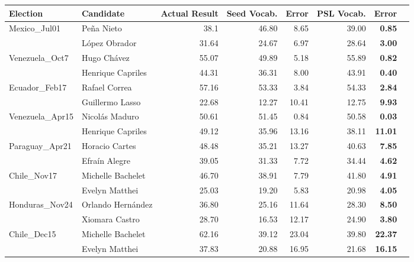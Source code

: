 \begin{table*}[ht]
		\centering
		\begin{tabular}{| l | l | r | r | r | r | r | r |}
		\hline
		Election & Candidate & Actual Result & Seed Vocab. & Error & PSL Vocab. & Error \\
		\hline
		\multirow{2}{*}{Mexico\_Jul01} & Pe\~{n}a Nieto & 38.1 & 46.80 & 8.65 & 39.00 & \textbf{0.85} \\\cline{2-7}
											   & L\'{o}pez Obrador & 31.64 & 24.67 & 6.97 & 28.64 & \textbf{3.00} \\
		\hline
		\multirow{2}{*}{Venezuela\_Oct7} & Hugo Ch\'{a}vez & 55.07 & 49.89 & 5.18 & 55.89 & \textbf{0.82}\\\cline{2-7}
																& Henrique Capriles & 44.31 & 36.31 & 8.00 & 43.91 & \textbf{0.40} \\
		\hline
		\multirow{2}{*}{Ecuador\_Feb17} & Rafael Correa & 57.16 & 53.33 & 3.84 & 54.33 & \textbf{2.84} \\\cline{2-7}
												 & Guillermo Lasso & 22.68 & 12.27 & 10.41 & 12.75 & \textbf{9.93} \\
		\hline
		 \multirow{2}{*}{Venezuela\_Apr15} & Nicol\'{a}s Maduro & 50.61 & 51.45 & 0.84 & 50.58 & \textbf{0.03} \\\cline{2-7}
																	& Henrique Capriles & 49.12 & 35.96 & 13.16 & 38.11 & \textbf{11.01} \\
		\hline
		\multirow{2}{*}{Paraguay\_Apr21} & Horacio Cartes & 48.48 & 35.21 & 13.27 & 40.63 & \textbf{7.85} \\\cline{2-7}
												   & Efra\'{i}n Alegre & 39.05 & 31.33 & 7.72 & 34.44 & \textbf{4.62} \\
		\hline
		\multirow{2}{*}{Chile\_Nov17} & Michelle Bachelet & 46.70 & 38.91 & 7.79 & 41.80 & \textbf{4.91}\\\cline{2-7}
														  & Evelyn Matthei & 25.03 & 19.20 & 5.83 & 20.98 & \textbf{4.05} \\
		\hline 
		\multirow{2}{*}{Honduras\_Nov24} & Orlando Hern\'{a}ndez & 36.80 & 25.16 & 11.64 & 28.30 & \textbf{8.50} \\\cline{2-7}
												   & Xiomara Castro & 28.70 & 16.53 & 12.17 & 24.90 & \textbf{3.80} \\
		\hline
		\multirow{2}{*}{Chile\_Dec15} & Michelle Bachelet & 62.16 & 39.12 & 23.04 & 39.80 & \textbf{22.37}\\\cline{2-7}
															& Evelyn Matthei & 37.83 & 20.88 & 16.95 & 21.68 & \textbf{16.15} \\

\end{tabular}
\end{table*}
